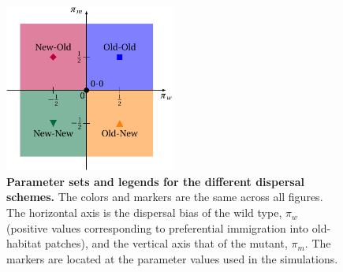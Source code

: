 \documentclass[11pt]{article}
\begin{document}
\begin{figure}[t]
	\centering
	\includegraphics[width=0.5\textwidth]{fig1.pdf}
	\caption{\textbf{Parameter sets and legends for the different dispersal schemes.} \small The colors and markers are the same across all figures. The horizontal axis is the dispersal bias of the wild type, $\pi_w$ (positive values corresponding to preferential immigration into old-habitat patches), and the vertical axis that of the mutant, $\pi_m$. The markers are located at the parameter values used in the simulations.
		}
	\label{fig:disp_schemes}
\end{figure}
\end{document}

